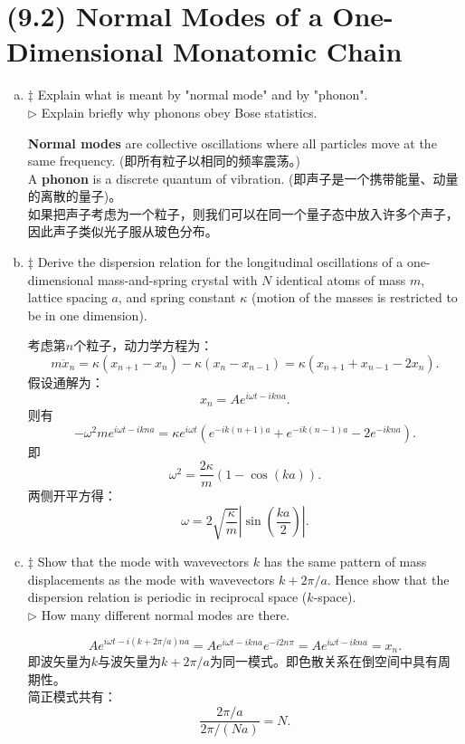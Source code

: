 \documentclass[reqno,a4paper,12pt]{amsart}
\begin{document}
\section{\textbf{(9.2) Normal Modes of a One-Dimensional Monatomic Chain}}
\begin{enumerate}[(a)]
	\item $\ddagger$ Explain what is meant by "normal mode" and by "phonon". \\
	$\triangleright$ Explain briefly why phonons obey Bose statistics.
	\begin{tcolorbox}[breakable, colback = black!5!white, colframe = black]
	\textbf{Normal modes} are collective oscillations where all particles move at the same frequency. (即所有粒子以相同的频率震荡。) \\
	A \textbf{phonon} is a discrete quantum of vibration. (即声子是一个携带能量、动量的离散的量子)。 \\
	如果把声子考虑为一个粒子，则我们可以在同一个量子态中放入许多个声子，因此声子类似光子服从玻色分布。
	\end{tcolorbox}
		
	\item $\ddagger$ Derive the dispersion relation for the longitudinal oscillations of a one-dimensional mass-and-spring crystal with $N$ identical atoms of mass $m$, lattice spacing $a$, and spring constant $\kappa$ (motion of the masses is restricted to be in one dimension).
	\begin{tcolorbox}[breakable, colback = black!5!white, colframe = black]
	考虑第$n$个粒子，动力学方程为：
	\[
		m\ddot{x}_n = \kappa(x_{n+1} - x_n) - \kappa(x_n-x_{n-1}) = \kappa(x_{n+1}+x_{n-1}-2x_n).
	\]
	假设通解为：
	\[
		x_n = A e^{i\omega t-ikna}.
	\]
	则有
	\[
		-\omega^2me^{i\omega t-ikna} = \kappa e^{i\omega t}(e^{-ik(n+1)a} + e^{-ik(n-1)a} - 2e^{-ikna}).
	\]
	即
	\[
		\omega^2 = \frac{2\kappa}{m}(1-\cos(ka)).
	\]
	两侧开平方得：
	\[
		\omega = 2\sqrt{\frac{\kappa}{m}}\left\vert \sin\left( \frac{ka}{2} \right) \right\vert.
	\]
	\end{tcolorbox}

	\item $\ddagger$ Show that the mode with wavevectors $k$ has the same pattern of mass displacements as the mode with wavevectors $k+2\pi/a$. Hence show that the dispersion relation is periodic in reciprocal space ($k$-space). \\
	$\triangleright$ How many different normal modes are there.
	\begin{tcolorbox}[breakable, colback = black!5!white, colframe = black]
	\[
	Ae^{i\omega t - i(k+2\pi/a)na} = A e^{i\omega t-ikna} e^{-i2n\pi} =  A e^{i\omega t-ikna} = x_n.
	\]
	即波矢量为$k$与波矢量为$k+2\pi/a$为同一模式。即色散关系在倒空间中具有周期性。\\
	简正模式共有：
	\[
		\frac{2\pi/a}{2\pi/(Na)} = N.
	\]
	\end{tcolorbox}
	

\end{enumerate}
\end{document}
